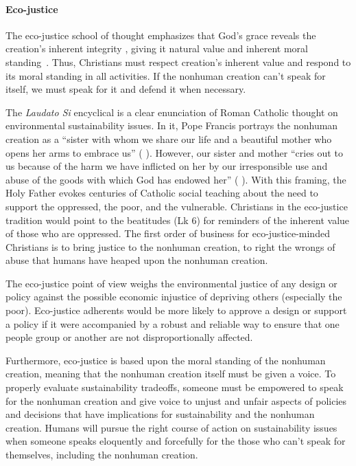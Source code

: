 \documentclass[12pt]{article}
\begin{document}
\paragraph{Eco-justice} 
\label{sec:eco-justice}

The eco-justice school of thought 
emphasizes that God's grace reveals the creation's 
inherent integrity \autocite[19]{Jenkins:2008}, 
giving it natural value and inherent moral standing~\autocite{Joldersma:2019}. 
Thus, Christians must respect creation's inherent value and 
respond to its moral standing in all activities.
If the nonhuman creation can't speak for itself, 
we must speak for it and defend it when necessary.

The \emph{Laudato Si} encyclical \autocite{Pope-Francis:2015aa} 
is a clear enunciation of Roman Catholic thought
on environmental sustainability issues.
In it, Pope Francis portrays the nonhuman creation as a
``sister with whom we share our life and a beautiful mother who opens her arms to embrace us''
(\textcite{Pope-Francis:2015aa} \textcite[3]{Pope-Francis:2015aa}).
However, our sister and mother
``cries out to us because of the harm we have inflicted on her 
by our irresponsible use and abuse of the goods with which God has endowed her''
(\textcite{Pope-Francis:2015aa} \textcite[3]{Pope-Francis:2015aa}).
With this framing, the Holy Father evokes centuries of Catholic social teaching
about the need to support the oppressed, the poor, and the vulnerable.
Christians in the eco-justice tradition would point to the beatitudes (Lk 6) 
for reminders of the inherent value of those who are oppressed.
The first order of business for eco-justice-minded Christians
is to bring justice to the nonhuman creation, to right the wrongs
of abuse that humans have heaped upon the nonhuman creation.

The eco-justice point of view
weighs the environmental justice of any design or policy
against the possible economic injustice of depriving others
(especially the poor). 
Eco-justice adherents would be more likely to approve a design or support a policy if it
were accompanied by a robust and reliable way to ensure that one people group or another
are not disproportionally affected.

Furthermore, eco-justice is based upon the moral standing of the nonhuman creation,
meaning that the nonhuman creation itself must be given a voice.
To properly evaluate sustainability tradeoffs,
someone must be empowered to speak for the nonhuman creation and
give voice to unjust and unfair aspects of policies and decisions
that have implications for sustainability and the nonhuman creation.
Humans will pursue the right course of action on sustainability issues
when someone speaks eloquently and forcefully for the
those who can't speak for themselves, including the nonhuman creation.
\end{document}
